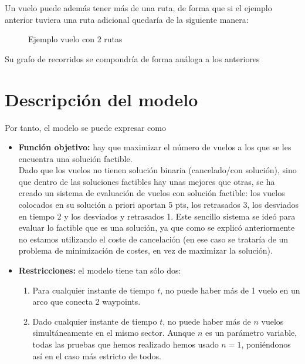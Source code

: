 Un vuelo puede además tener más de una ruta, de forma que si el ejemplo anterior tuviera una ruta adicional quedaría de la siguiente manera:
\begin{figure}[H]
	\centering
	
	\caption{Ejemplo vuelo con 2 rutas}
	\label{fig: Ejemplo vuelo con 2 rutas}
\end{figure}

Su grafo de recorridos se compondría de forma análoga a los anteriores

\section{Descripción del modelo}
Por tanto, el modelo se puede expresar como
\begin{itemize}
	\item \textbf{Función objetivo: }hay que maximizar el número de vuelos a los que se les encuentra una solución factible.\\
	 Dado que los vuelos no tienen solución binaria (cancelado/con solución), sino que dentro de las soluciones factibles hay unas mejores que otras, se ha creado un sistema de evaluación de vuelos con solución factible: los vuelos colocados en su solución a priori aportan 5 pts, los retrasados 3, los desviados en tiempo 2 y los desviados y retrasados 1. Este sencillo sistema se ideó para evaluar lo factible que es una solución, ya que como se explicó anteriormente no estamos utilizando el coste de cancelación (en ese caso se trataría de un problema de minimización de costes, en vez de maximizar la solución).
	\item \textbf{Restricciones:} el modelo tiene tan sólo dos:
	\begin{enumerate}
		\item Para cualquier instante de tiempo $t$, no puede haber más de 1 vuelo en un arco que conecta 2 waypoints. 
		\item Dado cualquier instante de tiempo $t$, no puede haber más de $n$ vuelos simultáneamente en el mismo sector. Aunque $n$ es un parámetro variable, todas las pruebas que hemos realizado hemos usado $n=1$, poniéndonos así en el caso más estricto de todos.
	\end{enumerate}
	
	
\end{itemize}
